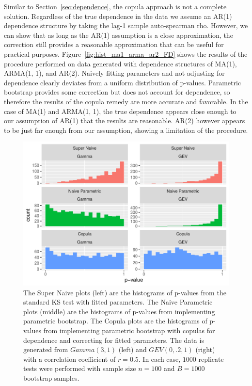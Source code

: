 \documentclass[12pt, letterpaper, titlepage]{article}
\begin{document}
Similar to Section~\ref{sec:dependence}, the copula approach is not a complete
solution. Regardless of the true dependence in the data we assume an AR(1)
dependence structure by taking the lag-1 sample auto-spearman rho. However, we
can show that as long as the AR(1) assumption is a close approximation, the
correction still provides a reasonable approximation that can be useful for
practical purposes. Figure~\ref{fig:hist_ma1_arma_ar2_FD} shows the results of the
procedure performed on data generated with dependence structures of  MA(1),
ARMA(1, 1), and AR(2). Naively fitting parameters and not adjusting for
dependence clearly deviates from a uniform distribution of p-values. Parametric
bootstrap provides some correction but does not account for dependence, so
therefore the results of the copula remedy are more accurate and favorable.
In the case of MA(1) and ARMA(1, 1), the true dependence appears close enough
to our assumption of AR(1) that the results are reasonable. AR(2) however
appears to be just far enough from our assumption, showing a limitation of the
procedure.

\begin{figure}[tbp]
  \centering
  \includegraphics[width=\textwidth]{hist_gamma_gev_FD}
  \caption{The Super Naive plots (left) are the histograms of p-values from the
  standard KS test with fitted parameters. The Naive Parametric plots (middle)
  are the histograms of p-values from implementing parametric bootstrap. The
  Copula plots are the histograms of p-values from implementing parametric
  bootstrap with copulas for dependence and correcting for fitted parameters.
  The data is generated from $Gamma(3, 1)$ (left) and $GEV(0, .2, 1)$ (right)
  with a correlation coefficient of $r = 0.5$. In each case, $1000$ replicate
  tests were performed with sample size $n = 100$ and $B = 1000$ bootstrap
  samples.}
  \label{fig:hist_gamma_gev_FD}
\end{figure}
\end{document}
